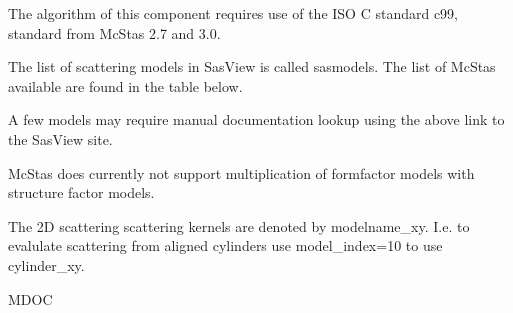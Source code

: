 The algorithm of this component requires use of the ISO C standard c99, standard from McStas 2.7 and 3.0.

The list of scattering models in SasView is called sasmodels. The list of McStas available  are found in the table below.

A few models may require manual documentation lookup using the above link to the SasView site.

McStas does currently not support multiplication of formfactor models with structure factor models.

The 2D scattering scattering kernels are denoted by modelname\_xy. I.e. to evalulate scattering from aligned cylinders use model\_index=10 to use cylinder\_xy.

MDOC

